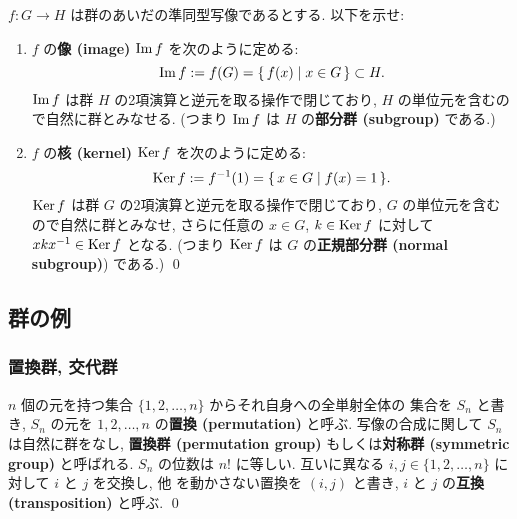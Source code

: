 \documentclass[12pt,twoside]{jarticle}
\begin{document}

\begin{question}[像, 核]
 $f:G\to H$ は群のあいだの準同型写像であるとする.
 以下を示せ:
 \begin{enumerate}
  \item $f$ の{\bf 像 (image)} $\mathop{\mathrm{Im}}\nolimits f$ を次のように定める:
   \begin{equation*}
    \mathop{\mathrm{Im}}\nolimits f := f(G) = \{\, f(x) \mid x\in G \,\} \subset H.
   \end{equation*}
   $\mathop{\mathrm{Im}}\nolimits f$ は群 $H$ の2項演算と逆元を取る操作で閉じており, 
   $H$ の単位元を含むので自然に群とみなせる.
   (つまり $\mathop{\mathrm{Im}}\nolimits f$ は $H$ の{\bf 部分群 (subgroup)} である.)
  \item $f$ の{\bf 核 (kernel)} $\mathop{\mathrm{Ker}}\nolimits f$ を次のように定める:
   \begin{equation*}
    \mathop{\mathrm{Ker}}\nolimits f := f^{-1}(1) = \{\, x\in G \mid f(x)=1 \,\}.
   \end{equation*}
   $\mathop{\mathrm{Ker}}\nolimits f$ は群 $G$ の2項演算と逆元を取る操作で閉じており, 
   $G$ の単位元を含むので自然に群とみなせ, 
   さらに任意の $x\in G$, $k\in\mathop{\mathrm{Ker}}\nolimits f$ に対して $xkx^{-1}\in\mathop{\mathrm{Ker}}\nolimits f$ となる.
   (つまり $\mathop{\mathrm{Ker}}\nolimits f$ は $G$ の{\bf 正規部分群 (normal subgroup)}) である.)
   \qed
 \end{enumerate}
\end{question}


\subsection{群の例}


\subsubsection{置換群, 交代群}

\begin{definition}
 $n$ 個の元を持つ集合 $\{1,2,\ldots,n\}$ からそれ自身への全単射全体の
 集合を $S_n$ と書き, $S_n$ の元を $1,2,\ldots,n$ の{\bf 置換  (permutation)} 
 と呼ぶ.  
 写像の合成に関して $S_n$ は自然に群をなし, 
 {\bf 置換群 (permutation group)} もしくは{\bf 対称群 (symmetric group)} 
 と呼ばれる.
 $S_n$ の位数は $n!$ に等しい.
 互いに異なる $i,j\in\{1,2,\ldots,n\}$ に対して $i$ と $j$ を交換し, 他
 を動かさない置換を $(i,j)$ と書き, $i$ と $j$ の{\bf 互換 (transposition)} 
 と呼ぶ.
 \qed
\end{definition}
\end{document}
